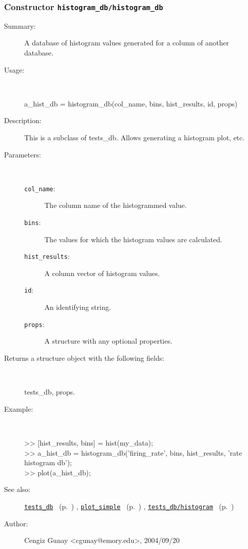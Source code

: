 \subsubsection[Constructor \texttt{histogram\_db}]{Constructor \texttt{histogram\_db/histogram\_db}}%
%
\label{ref_histogram_db__histogram_db}%
\hypertarget{ref_histogram_db__histogram_db}{}%
\begin{description}
\item[Summary:]A database of histogram values generated for 
		a column of another database.
%
\item[Usage:]~%
\begin{lyxcode}%
a\_hist\_db = histogram\_db(col\_name, bins, hist\_results, id, props)
%
\end{lyxcode}%
%
\item[Description:]%
This is a subclass of tests\_db. Allows generating a histogram plot, etc.
\item[Parameters:]~
\begin{description}%
\item[\texttt{col\_name}:]
 The column name of the histogrammed value.
\item[\texttt{bins}:]
 The values for which the histogram values are calculated.
\item[\texttt{hist\_results}:]
 A column vector of histogram values.
\item[\texttt{id}:]
 An identifying string.
\item[\texttt{props}:]
 A structure with any optional properties.
\end{description}%
%
\item[Returns a structure object with the following fields:]~

	tests\_db, props.
%
\item[Example:]~
\begin{lyxcode} >> [hist\_results, bins] = hist(my\_data);\\%
 >> a\_hist\_db = histogram\_db('firing\_rate', bins, hist\_results, 'rate histogram db');\\%
 >> plot(a\_hist\_db);\\%
\end{lyxcode}
%
\item[See also:]%
\hyperlink{ref_tests_db}{\texttt{tests\_db}}%
\ (p.~\pageref{ref_tests_db})%
%
, \hyperlink{ref_plot_simple}{\texttt{plot\_simple}}%
\ (p.~\pageref{ref_plot_simple})%
%
, \hyperlink{ref_tests_db__histogram}{\texttt{tests\_db/histogram}}%
\ (p.~\pageref{ref_tests_db__histogram})%
%
%
\item[Author:]%
Cengiz Gunay <cgunay@emory.edu>, 2004/09/20%
\end{description}
\methodline%
